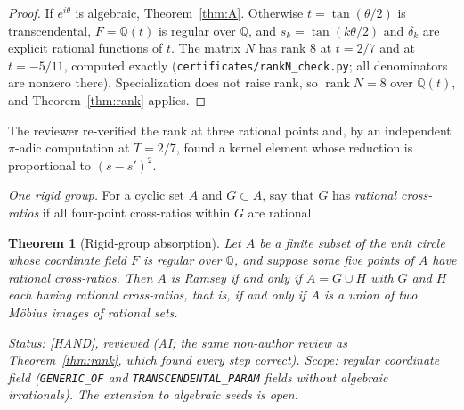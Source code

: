 \documentclass[11pt]{amsart}
\newcommand{\st}[1]{\textsf{[#1]}}
\newcommand{\Q}{\mathbb{Q}}
\theoremstyle{plain}
\newtheorem{theorem}{Theorem}[section]
\theoremstyle{definition}
\begin{document}
\begin{proof}
If $e^{i\theta}$ is algebraic, Theorem~\ref{thm:A}. Otherwise $t=\tan(\theta/2)$ is transcendental, $F=\Q(t)$
is regular over $\Q$, and $s_k=\tan(k\theta/2)$ and $\delta_k$ are explicit rational functions of $t$. The
matrix $N$ has rank $8$ at $t=2/7$ and at $t=-5/11$, computed exactly (\texttt{certificates/rankN\_check.py};
all denominators are nonzero there). Specialization does not raise rank, so $\operatorname{rank}N=8$ over
$\Q(t)$, and Theorem~\ref{thm:rank} applies.
\end{proof}

\noindent The reviewer re-verified the rank at three rational points and, by an
independent $\pi$-adic computation at $T=2/7$, found a kernel element whose reduction is proportional to
$(s-s')^2$.

\medskip
\noindent\emph{One rigid group.} For a cyclic set $A$ and $G\subset A$, say that $G$ has \emph{rational
cross-ratios} if all four-point cross-ratios within $G$ are rational.

\begin{theorem}[Rigid-group absorption]\label{thm:rigid}
Let $A$ be a finite subset of the unit circle whose coordinate field $F$ is regular over $\Q$, and suppose
some five points of $A$ have rational cross-ratios. Then $A$ is Ramsey if and only if $A=G\cup H$ with $G$
and $H$ each having rational cross-ratios, that is, if and only if $A$ is a union of two M\"obius images of
rational sets.

\smallskip\noindent\emph{Status:} \st{HAND}, reviewed (AI; the same non-author review as
Theorem~\ref{thm:rank}, which found every step correct). Scope: regular coordinate field
(\texttt{GENERIC\_OF} and \texttt{TRANSCENDENTAL\_PARAM} fields without algebraic irrationals).
The extension to algebraic seeds is open.
\end{theorem}
\end{document}
